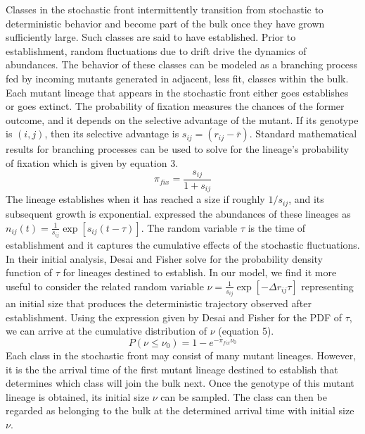 \documentclass[9pt,twocolumn,twoside]{gsajnl}
\begin{document}
Classes in the stochastic front intermittently transition from stochastic to deterministic behavior and become part of the bulk once they have grown sufficiently large. Such classes are said to have established. Prior to establishment, random fluctuations due to drift drive the dynamics of abundances.  The behavior of these classes can be modeled as a branching process fed by incoming mutants generated in adjacent, less fit, classes within the bulk. Each mutant lineage that appears in the stochastic front either goes establishes or goes extinct. The probability of fixation measures the chances of the former outcome, and it depends on the selective advantage of the mutant. If its genotype is $(i,j)$, then its selective advantage is $s_{ij}=(r_{ij}-\bar{r})$. Standard mathematical results for branching processes can be used to solve for the lineage's probability of fixation which is given by equation 3.
\begin{equation}
\pi_{fix} = \frac{s_{ij}}{ 1+s_{ij}}
\end{equation}
The lineage establishes when it has reached a size if roughly $1/s_{ij}$, and its subsequent growth is exponential. \cite{desai2007beneficial} expressed the abundances of these lineages as $n_{ij}(t) = \frac{1}{s_{ij}} \exp[{s_{ij}(t-\tau)}]$. The random variable $\tau$ is the time of establishment and it captures the cumulative effects of the stochastic fluctuations.  In their initial analysis, Desai and Fisher solve for the probability density function of $\tau$ for lineages destined to establish. In our model, we find it more useful to consider the related random variable $\nu = \frac{1}{s_{ij}}\exp[-\Delta r_{ij}\tau]$ representing an initial size that produces the deterministic trajectory observed after establishment. Using the expression given by Desai and Fisher for the PDF of $\tau$, we can arrive at the cumulative distribution of  $\nu$ (equation 5). 
\begin{equation}
P(\nu \leq \nu_0) = 1- e^{-\pi_{fix} \nu_0}
\end{equation}
Each class in the stochastic front may consist of many mutant lineages. However, it is the the arrival time of the first mutant lineage destined to establish that determines which class will join the bulk next. Once the genotype of this mutant lineage is obtained, its initial size $\nu$ can be sampled. The class can then be regarded as belonging to the bulk at the determined arrival time with initial size $\nu$. \par
\end{document}
